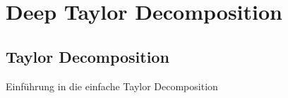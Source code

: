\chapter{Deep Taylor Decomposition}
\section{Taylor Decomposition}
Einführung in die einfache Taylor Decomposition